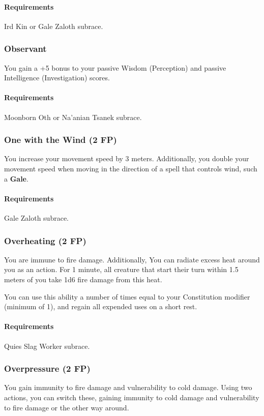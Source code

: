     \paragraph{Requirements} Ird Kin or Gale Zaloth subrace.
\subsubsection{Observant} \label{feat::observant}
    You gain a +5 bonus to your passive Wisdom (Perception) and passive Intelligence (Investigation) scores.
    \paragraph{Requirements} Moonborn Oth or Na'anian Tsanek subrace.
\subsubsection{One with the Wind (2 FP)} \label{feat::onewiththewind}
    You increase your movement speed by 3 meters.
    Additionally, you double your movement speed when moving in the direction of a spell that controls wind, such a \textbf{Gale}.
    \paragraph{Requirements} Gale Zaloth subrace.
\subsubsection{Overheating (2 FP)} \label{feat::overheating}
    You are immune to fire damage.
    Additionally, You can radiate excess heat around you as an action.
    For 1 minute, all creature that start their turn within 1.5 meters of you take 1d6 fire damage from this heat.

    You can use this ability a number of times equal to your Constitution modifier (minimum of 1), and regain all expended uses on a short rest.
    \paragraph{Requirements} Quies Slag Worker subrace.
\subsubsection{Overpressure (2 FP)} \label{feat::overpressure}
    You gain immunity to fire damage and vulnerability to cold damage.
    Using two actions, you can switch these, gaining immunity to cold damage and vulnerability to fire damage or the other way around.
